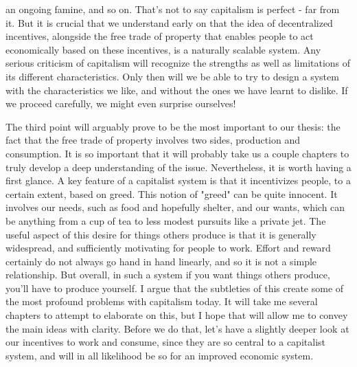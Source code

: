 \documentclass[12pt]{memoir}
\begin{document}
			an ongoing famine, and so on. That's not to say capitalism is perfect - far from it. But it is crucial that we understand early on that the idea of decentralized incentives, alongside the free trade of property that enables 
			people to act economically based on these incentives, is a naturally scalable system. Any serious criticism of capitalism will recognize the strengths as well as limitations of its different characteristics. Only then will 
			we be able to try to design a system with the characteristics we like, and without the ones we have learnt to dislike. If we proceed carefully, we might even  surprise ourselves!\
			 
			The third point will arguably prove to be the most important to our thesis: the fact that the free trade of property involves two sides, production and consumption. It is so important that it will probably 
			take us a couple chapters to truly develop a deep understanding of the issue. Nevertheless, it is worth having a first glance. A key feature of a capitalist system is that it incentivizes people, to a certain 
			extent, based on greed. This notion of "greed" can be quite innocent. It involves our needs, such as food and hopefully shelter, and our wants, which can be anything from a cup of tea to less modest pursuits 
			like a private jet. The useful aspect of this desire for things others produce is that it is generally widespread, and sufficiently motivating for people to work. Effort and reward certainly do not always go 
			hand in hand linearly, and so it is not a simple relationship. But overall, in such a system if you want things others produce, you'll have to produce yourself. I argue that the subtleties of this create some of 
			the most profound problems with capitalism today. It will take me several chapters to attempt to elaborate on this, but I hope that will allow me to convey the main ideas with clarity. Before we do that, let's 
			have a slightly deeper look at our incentives to work and consume, since they are so central to a capitalist system, and will in all likelihood be so for an improved economic system.
		
\end{document}
